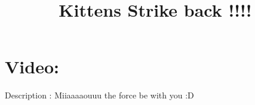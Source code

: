 \documentclass[11pt,a4paper]{article}
\title{Kittens Strike back !!!!}
\begin{document}
\maketitle
\section*{Video: }
\frame
{
}
Description : 
Miiaaaaouuu the force be with you :D
\end{document}

